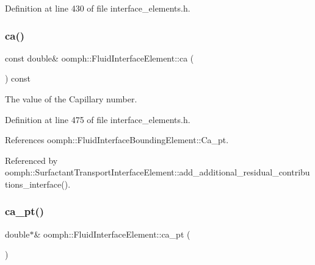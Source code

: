 Definition at line 430 of file interface\+\_\+elements.\+h.

\mbox{\label{classoomph_1_1FluidInterfaceElement_abcb18ff13b322136dd2346a6b40ecabc}} 
\subsubsection{\texorpdfstring{ca()}{ca()}}
{\footnotesize\ttfamily const double\& oomph\+::\+Fluid\+Interface\+Element\+::ca (\begin{DoxyParamCaption}{ }\end{DoxyParamCaption}) const\hspace{0.3cm}{\ttfamily [inline]}}



The value of the Capillary number. 



Definition at line 475 of file interface\+\_\+elements.\+h.



References oomph\+::\+Fluid\+Interface\+Bounding\+Element\+::\+Ca\+\_\+pt.



Referenced by oomph\+::\+Surfactant\+Transport\+Interface\+Element\+::add\+\_\+additional\+\_\+residual\+\_\+contributions\+\_\+interface().

\mbox{\label{classoomph_1_1FluidInterfaceElement_a1a950f0202d6dd15fab2f0c03927edc9}} 
\subsubsection{\texorpdfstring{ca\+\_\+pt()}{ca\_pt()}}
{\footnotesize\ttfamily double$\ast$\& oomph\+::\+Fluid\+Interface\+Element\+::ca\+\_\+pt (\begin{DoxyParamCaption}{ }\end{DoxyParamCaption})\hspace{0.3cm}{\ttfamily [inline]}}




